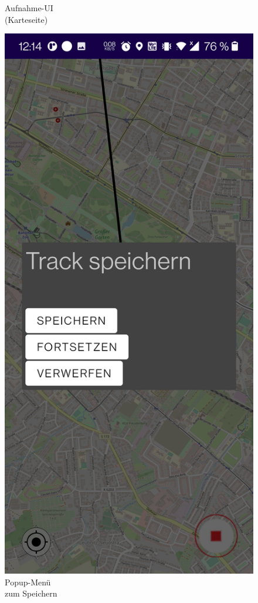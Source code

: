 \documentclass{article}
\begin{document}
\begin{figure}[H]
		  \centering
		  \caption{Aufnahme-UI \\(Karteseite)}
		\endminipage\hfill
		  \includegraphics[width=\linewidth]{10_fortsetzen3.jpg}
		  \centering
		  \caption{Popup-Menü \\zum Speichern}
		\endminipage
	\end{figure}
	\newpage
\end{document}
